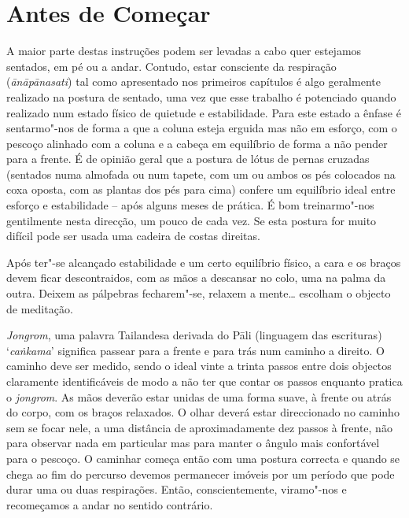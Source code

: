 \chapter{Antes de Começar}

A maior parte destas instruções podem ser levadas a cabo quer estejamos
sentados, em pé ou a andar. Contudo, estar consciente da respiração
(\emph{ānāpānasati}) tal como apresentado nos primeiros capítulos é algo
geralmente realizado na postura de sentado, uma vez que esse trabalho é
potenciado quando realizado num estado físico de quietude e
estabilidade. Para este estado a ênfase é sentarmo"-nos de forma a que a
coluna esteja erguida mas não em esforço, com o pescoço alinhado com a
coluna e a cabeça em equilíbrio de forma a não pender para a frente. É
de opinião geral que a postura de lótus de pernas cruzadas (sentados
numa almofada ou num tapete, com um ou ambos os pés colocados na coxa
oposta, com as plantas dos pés para cima) confere um equilíbrio ideal
entre esforço e estabilidade -- após alguns meses de prática. É bom
treinarmo"-nos gentilmente nesta direcção, um pouco de cada vez. Se esta
postura for muito difícil pode ser usada uma cadeira de costas direitas.

Após ter"-se alcançado estabilidade e um certo equilíbrio físico, a cara
e os braços devem ficar descontraidos, com as mãos a descansar no colo,
uma na palma da outra. Deixem as pálpebras fecharem"-se, relaxem a
mente\ldots{} escolham o objecto de meditação.

\emph{Jongrom}, uma palavra Tailandesa derivada do Pāli (linguagem das
escrituras) `\emph{caṅkama}' significa passear para a frente e para trás
num caminho a direito. O caminho deve ser medido, sendo o ideal vinte a
trinta passos entre dois objectos claramente
identificáveis de modo a não ter que contar os passos enquanto
pratica o \emph{jongrom}. As mãos deverão estar unidas de uma forma
suave, à frente ou atrás do corpo, com os braços relaxados. O olhar
deverá estar direccionado no caminho sem se focar nele, a uma distância
de aproximadamente dez passos à frente, não para observar nada em
particular mas para manter o ângulo mais confortável para o pescoço. O
caminhar começa então com uma postura correcta e quando se chega ao fim
do percurso devemos permanecer imóveis por um período que pode durar uma
ou duas respirações. Então, conscientemente, viramo"-nos e recomeçamos a
andar no sentido contrário.

